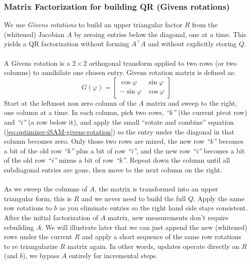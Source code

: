 \subsubsection{Matrix Factorization for building QR (Givens rotations)}
We use \emph{Givens rotations} to build an upper triangular factor $R$ from the (whitened) Jacobian $A$ by zeroing entries below the diagonal, one at a time. This yields a QR factorization without forming $A^\top A$ and without explicitly storing $Q$.
\\ \\
A Givens rotation is a $2\times 2$ orthogonal transform applied to two rows (or two columns) to annihilate one chosen entry. Givens rotation matrix is defined as:
\begin{equation}
    G(\varphi) =
    \begin{bmatrix}
        \cos\varphi & \sin\varphi \\
        -\sin\varphi & \cos\varphi
    \end{bmatrix}
    \label{eq:optimizer-iSAM-givens-rotation}
\end{equation}
Start at the leftmost non zero column of the $A$ matrix and sweep to the right, one column at a time. In each column, pick two rows, \textit{``k''} (the current pivot row) and \textit{``i''} (a row below it), and apply the small ``rotate and combine'' equation (\ref{eq:optimizer-iSAM-givens-rotation}) so the entry under the diagonal in that column becomes zero. Only those two rows are mixed, the new row \textit{``k''} becomes a bit of the old row \textit{``k''} plus a bit of row \textit{``i''}, and the new row \textit{``i''} becomes a bit of the old row \textit{``i''} minus a bit of row \textit{``k''}. Repeat down the column until all subdiagonal entries are gone, then move to the next column on the right. 
\\ \\
As we sweep the columns of $A$, the matrix is transformed into an upper triangular form, this is $R$ and we never need to build the full $Q$. Apply the same row rotations to $b$ as you eliminate entries so the right hand side stays consistent. After the initial factorization of $A$ matrix, new measurements don't require rebuilding $A$. We will illustrate later that we can just append the new (whitened) rows under the current $R$ and apply a short sequence of the same row rotations to re triangularize $R$ matrix again. In other words, updates operate directly on $R$ (and $b$), we bypass $A$ entirely for incremental steps.

